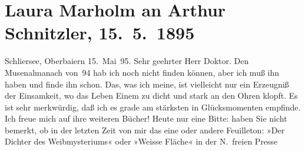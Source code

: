 

         
         \newcommand{\erwaehntePersonen}{Personen: Jules-Amédée Barbey d’Aurevilly}
         \newcommand{\erwaehnteOrte}{Orte: Oberbayern, Schliersee, Wien}
         \newcommand{\erwaehnteWerke}{Werke: Der Dichter des Weibmysteriums, Die Zukunft, Moderner Musen-Almanach auf das Jahr 1894. Ein Jahrbuch deutscher Kunst, Neue Freie Presse, Weiße Fläche, Wir Frauen und unsere Dichter}
               \section[Laura Marholm an Arthur Schnitzler, 15. 5. 1895]{ Laura Marholm an Arthur Schnitzler, 15. 5. 1895}\nopagebreak{}\rehead{ }\begin{ledgroupsized}[t]{13cm}\normalsize\beginnumbering \toendnotes[C]{\smallbreak\pagebreak[2]} 
\toendnotes[C]{\smallbreak}\pstart
           \noindent{}\raggedleft{}{\pb}Schliersee, Oberbaiern\pend
           \pstart
           \raggedleft{}15. Mai 95.\pend
           \pstart{}Sehr geehrter Herr Doktor.\pend\pstart
           Den Musenalmanach von 94 hab ich noch nicht
                    finden können, aber ich muß ihn haben und finde ihn schon. Das, was ich meine,
                    ist vielleicht nur ein Erzeugniß der Einsamkeit, wo das Leben Einem zu dicht und
                    stark an den Ohren klopft. Es ist sehr merkwürdig, daß ich es grade am stärksten
                    in Glücksmomenten empfinde.\pend
           \pstart
           Ich freue mich auf ihre weiteren Bücher!\pend
           \pstart
           Heute nur eine Bitte: haben Sie nicht bemerkt, ob in der letzten Zeit von mir das
                    eine oder andere Feuilleton: »Der Dichter des
                        Weibmysteriums« oder »Weisse
                            Fläche« in der N. freien Presse

\end{ledgroupsized}

